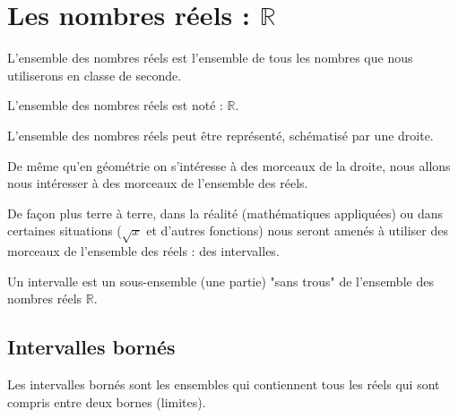 \vspace{-3mm}
\section{Les nombres réels : $\mathbb{R}$}

\vspace{-3mm}
\begin{defi}{}{}
L'ensemble des nombres réels est l'ensemble de tous les nombres que nous utiliserons en classe de seconde.

\noindent L'ensemble des nombres réels est noté : $\mathbb{R}$.
\end{defi}

\medskip
L'ensemble des nombres réels peut être représenté, schématisé par une droite. 

\begin{center}
\end{center}

\vspace{-3mm}
De même qu'en géométrie on s'intéresse à des morceaux de la droite, nous allons nous intéresser à des morceaux de l'ensemble des réels.
	
\noindent De façon plus terre à terre, dans la réalité (mathématiques appliquées) ou dans certaines situations ($\sqrt{x}$ et d'autres fonctions) nous seront amenés à utiliser des morceaux de l'ensemble des réels : des intervalles.

\begin{defi}{}{}
Un intervalle est un sous-ensemble (une partie) "sans trous" de l'ensemble des nombres réels $\mathbb{R}$.
\end{defi}

\subsection{Intervalles bornés}

Les intervalles bornés sont les ensembles qui contiennent tous les réels qui sont compris entre deux bornes (limites).

